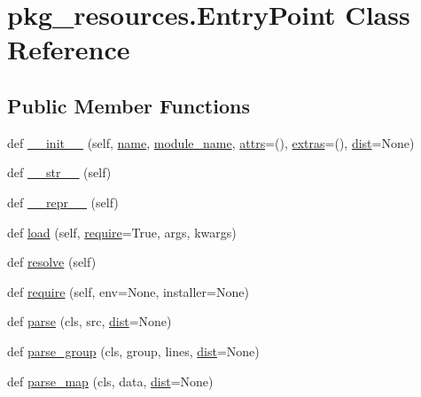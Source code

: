 \hypertarget{classpkg__resources_1_1EntryPoint}{}\section{pkg\+\_\+resources.\+Entry\+Point Class Reference}
\label{classpkg__resources_1_1EntryPoint}
\subsection*{Public Member Functions}
\begin{DoxyCompactItemize}
\item 
def \hyperlink{classpkg__resources_1_1EntryPoint_adf880358e5306e9187c4ea2538d321c8}{\+\_\+\+\_\+init\+\_\+\+\_\+} (self, \hyperlink{classpkg__resources_1_1EntryPoint_a91cc24785899a45662cb316373d754d5}{name}, \hyperlink{classpkg__resources_1_1EntryPoint_a2b39408f1bde9801e87a597f3b461b3b}{module\+\_\+name}, \hyperlink{classpkg__resources_1_1EntryPoint_aa9c9f7e56c09f62289e21c2fd012c11d}{attrs}=(), \hyperlink{classpkg__resources_1_1EntryPoint_a71c2a88d7240ad67d94466f4de66597d}{extras}=(), \hyperlink{classpkg__resources_1_1EntryPoint_aaae30521771283be73c089513c377773}{dist}=None)
\item 
def \hyperlink{classpkg__resources_1_1EntryPoint_ad68557d89e364b045aa0f3c39b80ea98}{\+\_\+\+\_\+str\+\_\+\+\_\+} (self)
\item 
def \hyperlink{classpkg__resources_1_1EntryPoint_a0eed4545673e7310df0f412db5b3ec03}{\+\_\+\+\_\+repr\+\_\+\+\_\+} (self)
\item 
def \hyperlink{classpkg__resources_1_1EntryPoint_a5438200cf3226e4762a3b94a456be23a}{load} (self, \hyperlink{classpkg__resources_1_1EntryPoint_a49ea4be9e415eb29e8d256e90097a665}{require}=True, args, kwargs)
\item 
def \hyperlink{classpkg__resources_1_1EntryPoint_a8c0fa0efa7012aab6b5711f0932bac9a}{resolve} (self)
\item 
def \hyperlink{classpkg__resources_1_1EntryPoint_a49ea4be9e415eb29e8d256e90097a665}{require} (self, env=None, installer=None)
\item 
def \hyperlink{classpkg__resources_1_1EntryPoint_a3b155a03ae9e3e5f722c8258ddcec0cd}{parse} (cls, src, \hyperlink{classpkg__resources_1_1EntryPoint_aaae30521771283be73c089513c377773}{dist}=None)
\item 
def \hyperlink{classpkg__resources_1_1EntryPoint_aa6103add7859c9b6e0338b6866fe44ba}{parse\+\_\+group} (cls, group, lines, \hyperlink{classpkg__resources_1_1EntryPoint_aaae30521771283be73c089513c377773}{dist}=None)
\item 
def \hyperlink{classpkg__resources_1_1EntryPoint_a925bbccfaed5f41e1f676adb88199afa}{parse\+\_\+map} (cls, data, \hyperlink{classpkg__resources_1_1EntryPoint_aaae30521771283be73c089513c377773}{dist}=None)
\end{DoxyCompactItemize}

